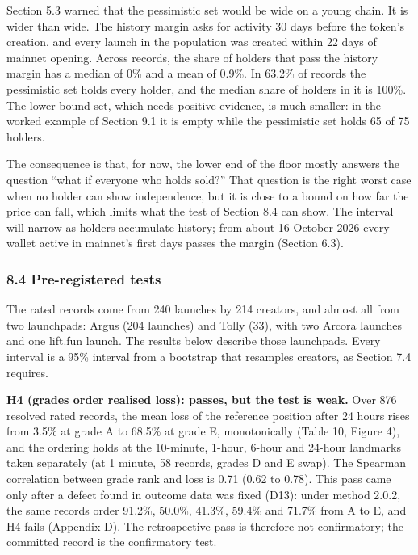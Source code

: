 Section 5.3 warned that the pessimistic set would be wide on a young chain. It is wider than wide. The history margin asks for activity 30 days before the token's creation, and every launch in the population was created within 22 days of mainnet opening. Across records, the share of holders that pass the history margin has a median of 0\% and a mean of 0.9\%. In 63.2\% of records the pessimistic set holds every holder, and the median share of holders in it is 100\%. The lower-bound set, which needs positive evidence, is much smaller: in the worked example of Section 9.1 it is empty while the pessimistic set holds 65 of 75 holders.

The consequence is that, for now, the lower end of the floor mostly answers the question ``what if everyone who holds sold?'' That question is the right worst case when no holder can show independence, but it is close to a bound on how far the price can fall, which limits what the test of Section 8.4 can show. The interval will narrow as holders accumulate history; from about 16 October 2026 every wallet active in mainnet's first days passes the margin (Section 6.3).

\subsubsection{8.4 Pre-registered tests}\label{pre-registered-tests}

The rated records come from 240 launches by 214 creators, and almost all from two launchpads: Argus (204 launches) and Tolly (33), with two Arcora launches and one lift.fun launch. The results below describe those launchpads. Every interval is a 95\% interval from a bootstrap that resamples creators, as Section 7.4 requires.

\textbf{H4 (grades order realised loss): passes, but the test is weak.} Over 876 resolved rated records, the mean loss of the reference position after 24 hours rises from 3.5\% at grade A to 68.5\% at grade E, monotonically (Table 10, Figure 4), and the ordering holds at the 10-minute, 1-hour, 6-hour and 24-hour landmarks taken separately (at 1 minute, 58 records, grades D and E swap). The Spearman correlation between grade rank and loss is 0.71 (0.62 to 0.78). This pass came only after a defect found in outcome data was fixed (D13): under method 2.0.2, the same records order 91.2\%, 50.0\%, 41.3\%, 59.4\% and 71.7\% from A to E, and H4 fails (Appendix D). The retrospective pass is therefore not confirmatory; the committed record is the confirmatory test.

